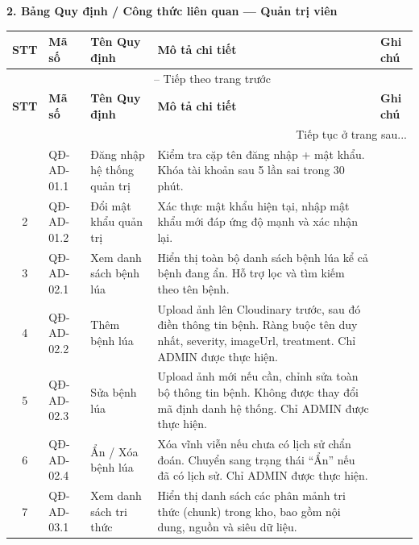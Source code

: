 \documentclass[12pt,a4paper]{article}
\begin{document}
\vspace{0.3cm}
\textbf{2. Bảng Quy định / Công thức liên quan --- Quản trị viên}

\begin{longtable}{|
        c|
        >{\raggedright\arraybackslash}p{2.4cm}|
        >{\raggedright\arraybackslash}p{3.4cm}|
        >{\raggedright\arraybackslash}p{6.0cm}|
        >{\raggedright\arraybackslash}p{1.4cm}|}

    \hline
    \rowcolor{headerblue}
    \textbf{STT} & \textbf{Mã số} & \textbf{Tên Quy định} & \textbf{Mô tả chi tiết} & \textbf{Ghi chú} \\
    \hline
    \endfirsthead
    \multicolumn{5}{c}{{\tablename\ -- Tiếp theo trang trước}} \\
    \hline
    \rowcolor{headerblue}
    \textbf{STT} & \textbf{Mã số} & \textbf{Tên Quy định} & \textbf{Mô tả chi tiết} & \textbf{Ghi chú} \\
    \hline
    \endhead
    \hline \multicolumn{5}{|r|}{{Tiếp tục ở trang sau...}} \\ \hline
    \endfoot
    \hline
    \endlastfoot
    1  & QĐ-AD-01.1 & Đăng nhập hệ thống quản trị  & Kiểm tra cặp tên đăng nhập + mật khẩu. Khóa tài khoản sau 5 lần sai trong 30 phút. &  \\
    \hline
    2  & QĐ-AD-01.2 & Đổi mật khẩu quản trị        & Xác thực mật khẩu hiện tại, nhập mật khẩu mới đáp ứng độ mạnh và xác nhận lại. &  \\
    \hline
    3  & QĐ-AD-02.1 & Xem danh sách bệnh lúa       & Hiển thị toàn bộ danh sách bệnh lúa kể cả bệnh đang ẩn. Hỗ trợ lọc và tìm kiếm theo tên bệnh. &  \\
    \hline
    4  & QĐ-AD-02.2 & Thêm bệnh lúa                & Upload ảnh lên Cloudinary trước, sau đó điền thông tin bệnh. Ràng buộc tên duy nhất, severity, imageUrl, treatment. Chỉ ADMIN được thực hiện. &  \\
    \hline
    5  & QĐ-AD-02.3 & Sửa bệnh lúa                 & Upload ảnh mới nếu cần, chỉnh sửa toàn bộ thông tin bệnh. Không được thay đổi mã định danh hệ thống. Chỉ ADMIN được thực hiện. &  \\
    \hline
    6  & QĐ-AD-02.4 & Ẩn / Xóa bệnh lúa            & Xóa vĩnh viễn nếu chưa có lịch sử chẩn đoán. Chuyển sang trạng thái ``Ẩn'' nếu đã có lịch sử. Chỉ ADMIN được thực hiện. &  \\
    \hline
    7  & QĐ-AD-03.1 & Xem danh sách tri thức       & Hiển thị danh sách các phân mảnh tri thức (chunk) trong kho, bao gồm nội dung, nguồn và siêu dữ liệu. &  \\

\end{longtable}
\end{document}
